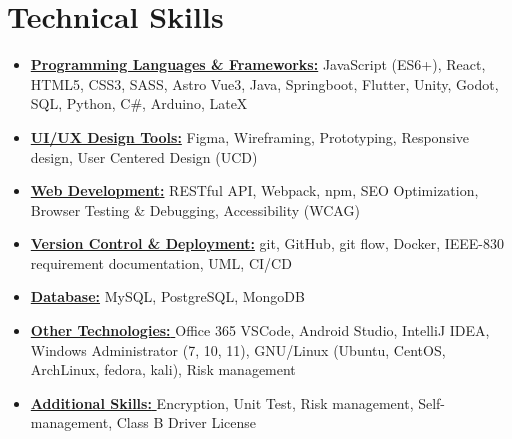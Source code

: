 \documentclass[11pt,a4paper,sans]{moderncv}
\newcommand{\sectionMargin}{-3mm}
\begin{document}
\section{Technical Skills}{
\begin{itemize}[label=\textbullet, noitemsep]
  \item {\underline{\textbf{Programming Languages \& Frameworks:}} 
    {JavaScript (ES6+)},
    {React},
    {HTML5},
    {CSS3},
    {SASS},
    {Astro}
    {Vue3},
    {Java},
    {Springboot},
    {Flutter},
    {Unity},
    {Godot},
    {SQL},
    {Python},
    {C\#},
    {Arduino},
    {LateX}
  }
  \item {\underline{\textbf{UI/UX Design Tools:}}
    {Figma},
    {Wireframing},
    {Prototyping},
    {Responsive design},
    {User Centered Design (UCD)}
  }
  \item {\underline{\textbf{Web Development:}}
    {RESTful API},
    {Webpack},
    {npm},
    {SEO Optimization},
    {Browser Testing \& Debugging},
    {Accessibility (WCAG)}
  }
  \item {\underline{\textbf{Version Control \& Deployment:}}
    {git},
    {GitHub},
    {git flow},
    {Docker},
    {IEEE-830} requirement documentation,
    {UML},
    {CI/CD}
  }
  \item {\underline{\textbf{Database:}}
    {MySQL},
    {PostgreSQL},
    {MongoDB}
  }
  \item {\underline{\textbf{Other Technologies: }}
    {Office 365}  
    {VSCode},
    {Android Studio},
    {IntelliJ IDEA},
    {Windows Administrator} (7, 10, 11),
    {GNU/Linux} (Ubuntu, CentOS, ArchLinux, fedora, kali),
    {Risk management}
  }
  \item {\underline{\textbf{Additional Skills: }}
    {Encryption},
    {Unit Test},
    {Risk management},  
    {Self-management},
    {Class B} Driver License
  }
\end{itemize}}

\vspace*{\sectionMargin}
\end{document}
